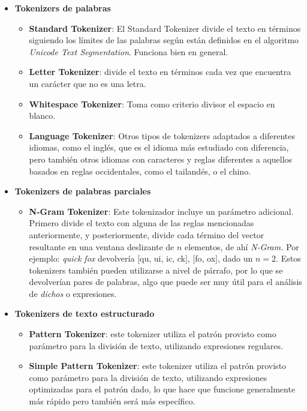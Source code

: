 \begin{itemize}
    
    \item \textbf{Tokenizers de palabras}
    \begin{itemize}
        \item \textbf{Standard Tokenizer}: El Standard Tokenizer divide el texto en términos siguiendo los límites de las palabras según están definidos en el algoritmo \textit{Unicode Text Segmentation}. Funciona bien en general.
        \item \textbf{Letter Tokenizer}: divide el texto en términos cada vez que encuentra un carácter que no es una letra.
        \item \textbf{Whitespace Tokenizer}: Toma como criterio divisor el espacio en blanco.
        \item \textbf{Language Tokenizer}: Otros tipos de tokenizers adaptados a diferentes idiomas, como el inglés, que es el idioma más estudiado con diferencia, pero también otros idiomas con caracteres y reglas diferentes a aquellos basados en reglas occidentales, como el tailandés, o el chino.
    \end{itemize}
    \item \textbf{Tokenizers de palabras parciales}
    \begin{itemize}
        \item \textbf{N-Gram Tokenizer}: Este tokenizador incluye un parámetro adicional. Primero divide el texto con alguna de las reglas mencionadas anteriormente, y posteriormente, divide cada término del vector resultante en una ventana deslizante de $n$ elementos, de ahí \textit{N-Gram.} Por ejemplo: \textit{quick fox} devolvería $[$qu, ui, ic, ck$]$, $[$fo, ox$]$, dado un $n = 2$. Estos tokenizers también pueden utilizarse a nivel de párrafo, por lo que se devolverían pares de palabras, algo que puede ser muy útil para el análisis de \textit{dichos} o expresiones.
    \end{itemize}
    \item \textbf{Tokenizers de texto estructurado}
    \begin{itemize}
        \item \textbf{Pattern Tokenizer}: este tokenizer utiliza el patrón provisto como parámetro para la división de texto, utilizando expresiones regulares.
        \item \textbf{Simple Pattern Tokenizer}: este tokenizer utiliza el patrón provisto como parámetro para la división de texto, utilizando expresiones optimizadas para el patrón dado, lo que hace que funcione generalmente más rápido pero también será más específico.
    \end{itemize}
\end{itemize}


